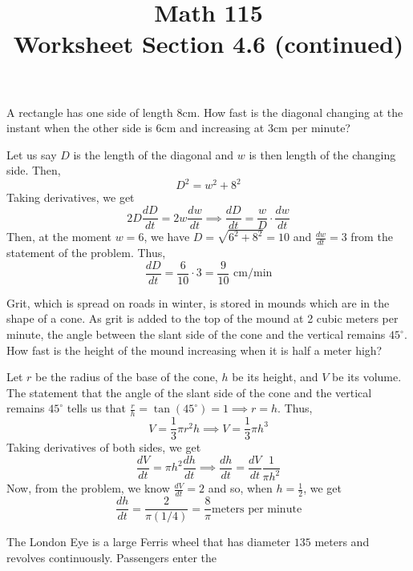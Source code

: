 \documentclass[11pt]{exam}
\title{\vspace{-0.5in} Math 115 \\ Worksheet Section 4.6 (continued)}
\date{}
\begin{document}
\maketitle
\vspace{-0.75in}
\begin{questions}
  \question A rectangle has one side of length \(8\)cm. How fast is
    the diagonal changing at the instant when the other side is
    \(6\)cm and increasing at \(3\)cm per minute?
    \begin{solution}
      Let us say \(D\) is the length of the diagonal and \(w\) is then
      length of the changing side. Then, \[
        D^2 = w^2+8^2
      \]
      Taking derivatives, we get \[
       2D \frac{dD}{dt}  = 2w \frac{dw}{dt} \implies \frac{dD}{dt} =
       \frac{w}{D} \cdot \frac{dw}{dt}
      \]
      Then, at the moment \(w = 6\), we have \(D = \sqrt{6^2+8^2} =
      10\) and \(\frac{dw}{dt} = 3\) from the statement of the
      problem. Thus, \[
        \frac{dD}{dt} = \frac{6}{10} \cdot 3 = \frac{9}{10} \text{ cm/min}
      \]
    \end{solution}
    \vspace{0.25in}
  \question Grit, which is spread on roads in winter, is stored in mounds which are in the shape of a cone.  As grit is added to the top of the mound at 2 cubic meters per minute, the angle between the slant side of the cone and the vertical remains $45^\circ$.  How fast is the height of the mound increasing when it is half a meter high?
    \begin{solution}
      Let \(r\) be the radius of the base of the cone, \(h\) be its
      height, and \(V\) be its volume. The statement that the angle of
      the slant side of the cone and 
      the vertical remains \(45^\circ\) tells us that \(\frac{r}{h} =
      \tan(45^\circ) = 1 \implies r = h\). Thus, \[
        V = \frac{1}{3} \pi r^2 h \implies V = \frac{1}{3} \pi h^3
      \]
      Taking derivatives of both sides, we get \[
        \frac{dV}{dt} = \pi h^2 \frac{dh}{dt} \implies \frac{dh}{dt} =
        \frac{dV}{dt} \frac{1}{\pi h^2}
      \]
      Now, from the problem, we know \(\frac{dV}{dt} = 2\) and so,
      when \(h = \frac{1}{2}\), we get \[
        \frac{dh}{dt} = \frac{2}{\pi (1/4)} = \frac{8}{\pi} \text{
          meters per minute}
      \]
    \end{solution}
    \vspace{0.25in}
  \question The London Eye is a large Ferris wheel that has diameter
    \(135\) meters and revolves continuously. Passengers enter the

\end{questions}
\end{document}
